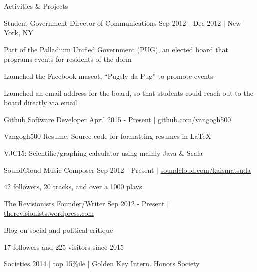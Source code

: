 \documentclass {vangogh500-resume}
\begin{document}
\begin{minipage}[t]{0.64\textwidth}
\begin {newcategory} {Activities \& Projects}
\begin{job} {Student Government} {Director of Communications}
			Sep 2012 - Dec 2012 $|$ New York, NY
			\begin{tightbullets}
				\item Part of the Palladium Unified Government (PUG), an elected board that programs events for residents of the dorm
				\item Launched the Facebook mascot, ``Pugsly da Pug'' to promote events
				\item Launched an email address for the board, so that students could reach out to the board directly via email
			\end{tightbullets}
		\end {job}
		\begin{job} {Github} {Software Developer}
			April 2015 - Present $|$ \href{https://github.com/vangogh500} {github.com/vangogh500}
			\begin{tightbullets}
				\item Vangogh500-Resume: Source code for formatting resumes in LaTeX
				\item VJC15: Scientific/graphing calculator using mainly Java \& Scala
			\end{tightbullets}
		\end{job}
		\begin{job} {SoundCloud} {Music Composer}
			Sep 2012 - Present $|$ \href{https://soundcloud.com/kaismatsuda} {soundcloud.com/kaismatsuda}
			\begin{tightbullets}
				\item 42 followers, 20 tracks, and over a 1000 plays
			\end{tightbullets}
		\end{job}
		\begin{job} {The Revisionists} {Founder/Writer}
			Sep 2012 - Present $|$ \href{https://therevisionists.wordpress.com} {therevisionists.wordpress.com}
			\begin{tightbullets}
				\item Blog on social and political critique
				\item 17 followers and 225 visitors since 2015
			\end{tightbullets}
		\end {job}
	\end {newcategory}
	\vspace{10pt}
	\begin {newcategory} {Societies}
		2014 $|$ top 15\%ile | Golden Key Intern. Honors Society
	\end {newcategory}
\end {minipage}
\end{document}
